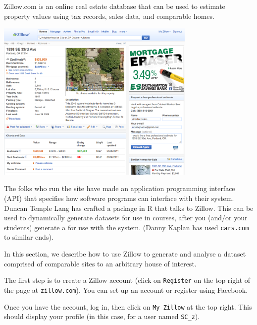 
Zillow.com is an online real estate database that can be used to estimate
property values using tax records, sales data, and comparable homes.  

\centerline{\includegraphics[width=3.8in]{images/zillow1.png}}

The folks who run the site have made an application programming interface (API) 
that specifies 
how software programs can interface with their system.  Duncan Temple Lang has
crafted a package in R that talks to Zillow. 
This can be used to dynamically generate datasets for use in courses, after
you (and/or your students) generate a  for use with the system.
(Danny Kaplan has used {\tt cars.com} to similar ends).


In this section, we describe how to use Zillow to generate and analyse a
dataset comprised of comparable sites to an arbitrary house of interest.

The first step is to create a Zillow account (click on \verb!Register! on the
top right of the page at \verb!zillow.com!).  You can set up an account or register
using Facebook.
%

Once you have the account, log in, then click on \verb!My Zillow! at the top right.
This should display your profile (in this case, for a user named \verb!SC_z!).

